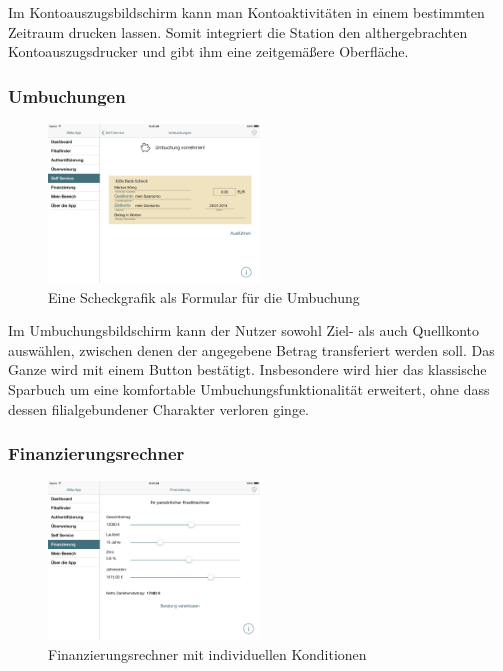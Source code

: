 	Im Kontoauszugsbildschirm kann man Kontoaktivitäten in einem bestimmten Zeitraum drucken lassen. Somit integriert die Station den althergebrachten Kontoauszugsdrucker und gibt ihm eine zeitgemäßere Oberfläche.

\subsubsection{Umbuchungen}
\begin{figure}[h]
	\centering
  \includegraphics[width=0.5\textwidth]{Pictures/umbuchung}
	\caption{Eine Scheckgrafik als Formular für die Umbuchung}
	\label{fig8}
\end{figure}

	Im Umbuchungsbildschirm kann der Nutzer sowohl Ziel- als auch Quellkonto auswählen, zwischen denen der angegebene Betrag transferiert werden soll. Das Ganze wird mit einem Button bestätigt. Insbesondere wird hier das klassische Sparbuch um eine komfortable Umbuchungsfunktionalität erweitert, ohne dass dessen filialgebundener Charakter verloren ginge.
\pagebreak
\subsubsection{Finanzierungsrechner}
\begin{figure}[h]
	\centering
  \includegraphics[width=0.5\textwidth]{Pictures/finanzierung}
	\caption{Finanzierungsrechner mit individuellen Konditionen}
	\label{fig9}
\end{figure}

